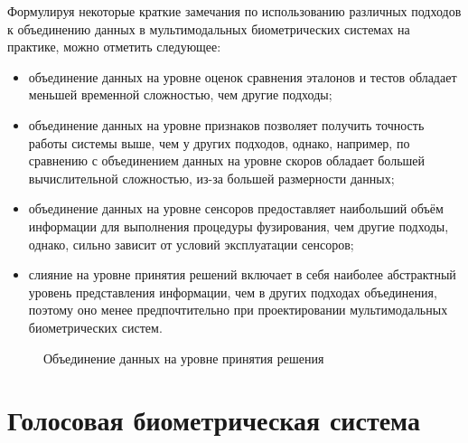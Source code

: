 \documentclass[12pt]{book}
\begin{document}
{\large{Формулируя некоторые краткие замечания по использованию различных подходов к объединению данных в мультимодальных биометрических системах на практике, можно отметить следующее:

\begin{itemize}[topsep=1pt] \itemsep0.1em
\item объединение данных на уровне оценок сравнения эталонов и тестов обладает меньшей временн\textit{о}й сложностью, чем другие подходы;
\item объединение данных на уровне признаков позволяет получить точность работы системы выше, чем у других подходов, однако, например, по сравнению с объединением данных на уровне скоров обладает большей вычислительной сложностью, из-за большей размерности данных;
\item объединение данных на уровне сенсоров предоставляет наибольший объём информации для выполнения процедуры фузирования, чем другие подходы, однако, сильно зависит от условий эксплуатации сенсоров;
\item слияние на уровне принятия решений включает в себя наиболее абстрактный уровень представления информации, чем в других подходах объединения, поэтому оно менее предпочтительно при проектировании мультимодальных биометрических систем.
\end{itemize}

}

\begin{figure}[]
\caption{Объединение данных на уровне принятия решения}
\label{fig:figure_1_11}
\end{figure}


\section{Голосовая биометрическая система}

}
\end{document}

